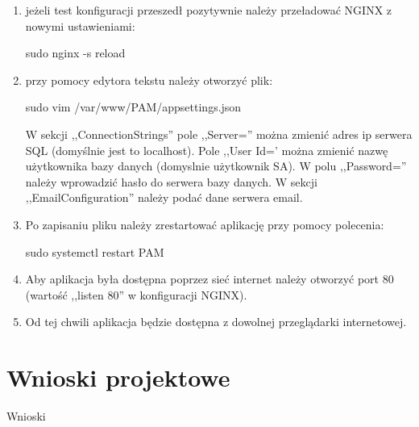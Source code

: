 \documentclass[12pt,a4paper]{article}
\begin{document}
\begin{enumerate}
				\item jeżeli test konfiguracji przeszedł pozytywnie należy przeładować NGINX z nowymi ustawieniami:	
					\begin{tcolorbox}[minipage,colback=white,arc=0pt,outer arc=0pt, fontupper=\footnotesize]
						sudo nginx -s reload
					\end{tcolorbox}			
			
				\item przy pomocy edytora tekstu należy otworzyć plik:
					\begin{tcolorbox}[minipage,colback=white,arc=0pt,outer arc=0pt, fontupper=\footnotesize]
						sudo vim /var/www/PAM/appsettings.json
					\end{tcolorbox}						
					W sekcji ,,ConnectionStrings'' pole ,,Server='' można zmienić adres ip serwera SQL (domyślnie jest to localhost). Pole ,,User Id=' można zmienić nazwę użytkownika bazy
					danych (domyslnie użytkownik SA). W polu ,,Password='' należy wprowadzić hasło do serwera bazy danych. W sekcji ,,EmailConfiguration'' należy podać dane serwera email.
				\item Po zapisaniu pliku należy zrestartować aplikację przy pomocy polecenia: \\
					\begin{tcolorbox}[minipage,colback=white,arc=0pt,outer arc=0pt, fontupper=\footnotesize]
						sudo systemctl restart PAM
					\end{tcolorbox}
				\item Aby aplikacja była dostępna poprzez sieć internet należy otworzyć port 80 (wartość ,,listen	80'' w konfiguracji NGINX).
				\item Od tej chwili aplikacja będzie dostępna z dowolnej przeglądarki internetowej. 
			\end{enumerate}
	\newpage
	
	\section{Wnioski projektowe}
		\indent Wnioski
\end{document}
